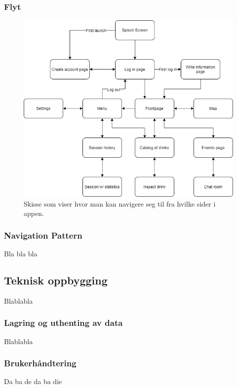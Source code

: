 \documentclass[12pt]{article}
\begin{document}
    \subsubsection{Flyt}

    \begin{figure}[H]
        \centering
        \includegraphics[scale=0.5]{images/lille_promille_float_diagram.drawio.png}
        \caption{Skisse som viser hvor man kan navigere seg til fra hvilke sider i appen.}
    \end{figure}

    \subsubsection{Navigation Pattern}
    Bla bla bla

\subsection{Teknisk oppbygging}
Blablabla

    \subsubsection{Lagring og uthenting av data}
    Blablabla

    \subsubsection{Brukerhåndtering}
    Da ba de da ba die
\end{document}
